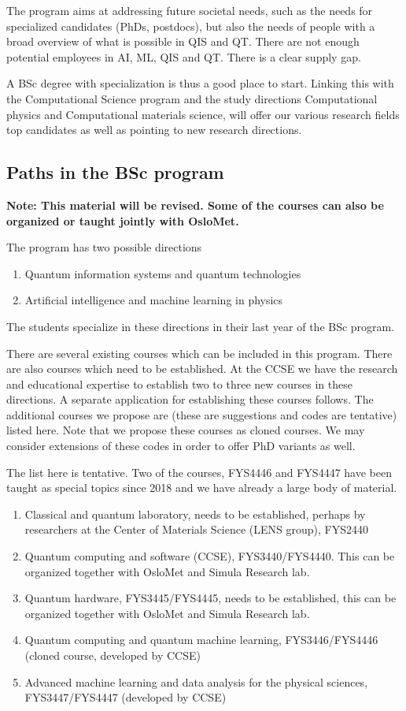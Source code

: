 \documentclass[aps,rmp,preprint,amsmath,amssymb,graphicx,longbibliography]{revtex4-1}
\begin{document}
The program aims at addressing future societal needs, such as the  needs for specialized candidates (PhDs, postdocs), but also the needs of  people with a broad overview of what is possible in  QIS and QT. There are  not enough potential employees in AI, ML, QIS and QT. There is  a clear supply gap.

A BSc degree  with specialization  is thus a good place to start. Linking this with the Computational Science program and the study directions Computational physics and Computational materials science, will offer our various research fields top candidates as well as pointing to new research directions. 

\subsection{Paths in the BSc program}
{\bf Note: This material will be revised. Some of the courses can also be organized or taught jointly with OsloMet.}


The program has two possible directions
\begin{enumerate}
    \item Quantum information systems and quantum technologies
    \item Artificial intelligence and machine learning in physics
\end{enumerate}
The students specialize in these directions in their last year of the BSc program.

There are several existing courses which can be included in this program. There are also courses which need to be established. At the CCSE we have the research and educational expertise to establish two to three new courses in these directions.
A separate application for establishing these courses follows. The additional courses we propose are (these are suggestions and codes are tentative) listed here. Note that we propose these courses as cloned courses. We may consider extensions of these codes in order to offer PhD variants as well.


The list here is tentative. Two of the courses, FYS4446 and FYS4447 have been taught as special topics since 2018 and we have already a large body of material.
\begin{enumerate}
    \item \color{red} Classical and quantum laboratory, needs to be established, perhaps by researchers at the Center of Materials Science (LENS group), FYS2440
    \item Quantum computing and software (CCSE), FYS3440/FYS4440. This can be organized together with OsloMet and Simula Research lab.
    \item Quantum hardware, FYS3445/FYS4445, needs to be established, this can be organized together with OsloMet and Simula Research lab. 
    \item Quantum computing and quantum machine learning, FYS3446/FYS4446 (cloned course, developed by CCSE)
    \item Advanced machine learning and data analysis for the physical sciences, FYS3447/FYS4447 (developed by CCSE)
\end{enumerate}
\end{document}
